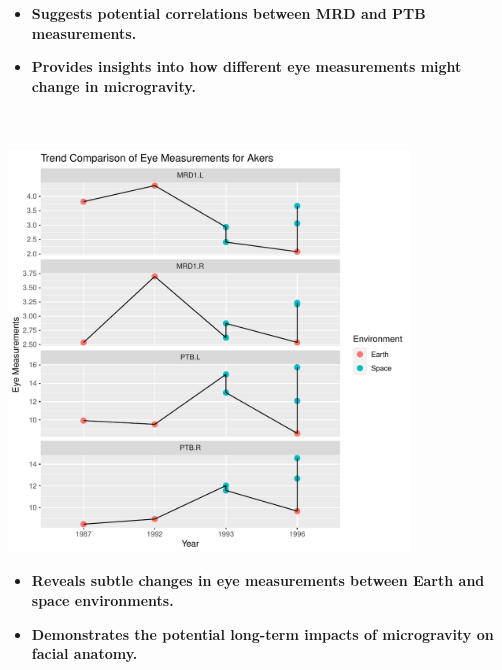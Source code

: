 \documentclass[a0paper,fleqn]{betterposter}
\begin{document}
{{\begin{minipage}[t]{0.45\textwidth}
{\fontsize{30}{40}\selectfont 
\begin{itemize}
    \item \textbf{Suggests potential correlations between MRD and PTB measurements.}
    \item \textbf{Provides insights into how different eye measurements might change in microgravity.}
\end{itemize}
}  \\ \\
\vspace{2cm}
\includegraphics[width=0.8\textwidth]{plots/Line_Plot.pdf} \\
{\fontsize{30}{40}\selectfont 
\begin{itemize}
    \item \textbf{Reveals subtle changes in eye measurements between Earth and space environments.}
    \item \textbf{Demonstrates the potential long-term impacts of microgravity on facial anatomy.}
\end{itemize}
}
\end{minipage}

}{

}{


}
}{

}
\end{document}
